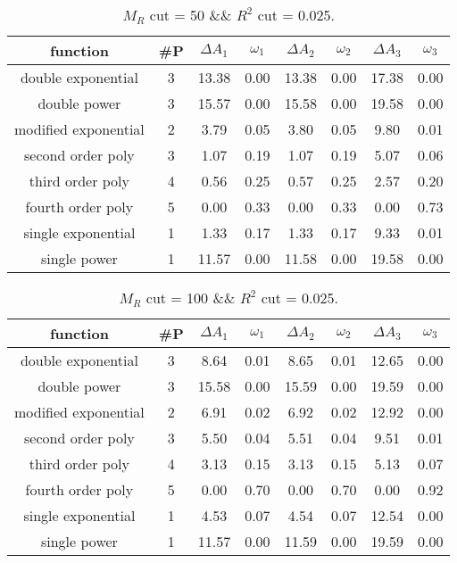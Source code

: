  
\begin{table}[H] 
\begin{center} 
\begin{tabular}{|c|c|cc|cc|cc|} 
\hline function & \#P & $\Delta A_1$ & $\omega_1$ & $\Delta A_2$ & $\omega_2$ & $\Delta A_3$ & $\omega_3$ \\ \hline 
double exponential &  3 &  13.38 &   0.00 &  13.38 &   0.00 &  17.38 &   0.00 \\ 
double power &  3 &  15.57 &   0.00 &  15.58 &   0.00 &  19.58 &   0.00 \\ 
modified exponential &  2 &   3.79 &   0.05 &   3.80 &   0.05 &   9.80 &   0.01 \\ 
second order poly &  3 &   1.07 &   0.19 &   1.07 &   0.19 &   5.07 &   0.06 \\ 
third order poly &  4 &   0.56 &   0.25 &   0.57 &   0.25 &   2.57 &   0.20 \\ 
fourth order poly &  5 &   0.00 &   0.33 &   0.00 &   0.33 &   0.00 &   0.73 \\ 
single exponential &  1 &   1.33 &   0.17 &   1.33 &   0.17 &   9.33 &   0.01 \\ 
single power &  1 &  11.57 &   0.00 &  11.58 &   0.00 &  19.58 &   0.00 \\ 
\hline 
\end{tabular} 
\caption{$M_R$ cut = 50 \&\& $R^2$ cut = 0.025.} 
\label{tab:FitChoices_50_0.025} 
\end{center} 
\end{table} 
 
 
\begin{table}[H] 
\begin{center} 
\begin{tabular}{|c|c|cc|cc|cc|} 
\hline function & \#P & $\Delta A_1$ & $\omega_1$ & $\Delta A_2$ & $\omega_2$ & $\Delta A_3$ & $\omega_3$ \\ \hline 
double exponential &  3 &   8.64 &   0.01 &   8.65 &   0.01 &  12.65 &   0.00 \\ 
double power &  3 &  15.58 &   0.00 &  15.59 &   0.00 &  19.59 &   0.00 \\ 
modified exponential &  2 &   6.91 &   0.02 &   6.92 &   0.02 &  12.92 &   0.00 \\ 
second order poly &  3 &   5.50 &   0.04 &   5.51 &   0.04 &   9.51 &   0.01 \\ 
third order poly &  4 &   3.13 &   0.15 &   3.13 &   0.15 &   5.13 &   0.07 \\ 
fourth order poly &  5 &   0.00 &   0.70 &   0.00 &   0.70 &   0.00 &   0.92 \\ 
single exponential &  1 &   4.53 &   0.07 &   4.54 &   0.07 &  12.54 &   0.00 \\ 
single power &  1 &  11.57 &   0.00 &  11.59 &   0.00 &  19.59 &   0.00 \\ 
\hline 
\end{tabular} 
\caption{$M_R$ cut = 100 \&\& $R^2$ cut = 0.025.} 
\label{tab:FitChoices_100_0.025} 
\end{center} 
\end{table} 
 
